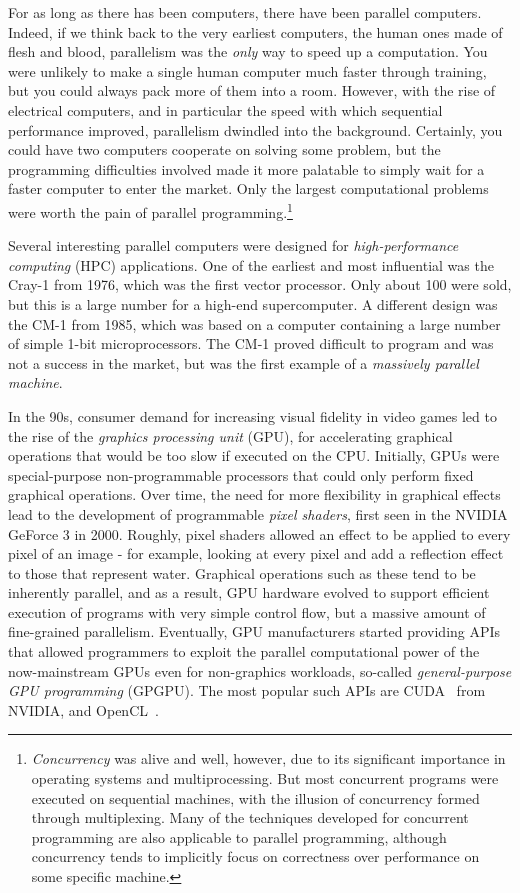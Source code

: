 For as long as there has been computers, there have been parallel
computers.  Indeed, if we think back to the very earliest computers,
the human ones made of flesh and blood, parallelism was the
\textit{only} way to speed up a computation.  You were unlikely to
make a single human computer much faster through training, but you
could always pack more of them into a room.  However, with the rise of
electrical computers, and in particular the speed with which
sequential performance improved, parallelism dwindled into the
background.  Certainly, you could have two computers cooperate on
solving some problem, but the programming difficulties involved made
it more palatable to simply wait for a faster computer to enter the
market.  Only the largest computational problems were worth the pain
of parallel programming.\footnote{\textit{Concurrency} was alive and
  well, however, due to its significant importance in operating
  systems and multiprocessing.  But most concurrent programs were
  executed on sequential machines, with the illusion of concurrency
  formed through multiplexing.  Many of the techniques developed for
  concurrent programming are also applicable to parallel programming,
  although concurrency tends to implicitly focus on correctness over
  performance on some specific machine.}

Several interesting parallel computers were designed for
\textit{high-performance computing} (HPC) applications.  One of the
earliest and most influential was the Cray-1 from 1976, which was the
first vector processor.  Only about 100 were sold, but this is a large
number for a high-end supercomputer.  A different design was the CM-1
from 1985, which was based on a computer containing a large number of
simple 1-bit microprocessors.  The CM-1 proved difficult to program
and was not a success in the market, but was the first example of a
\textit{massively parallel machine}.

In the 90s, consumer demand for increasing visual fidelity in video
games led to the rise of the \textit{graphics processing unit} (GPU),
for accelerating graphical operations that would be too slow if
executed on the CPU.  Initially, GPUs were special-purpose
non-programmable processors that could only perform fixed graphical
operations.  Over time, the need for more flexibility in graphical
effects lead to the development of programmable \textit{pixel
  shaders}, first seen in the NVIDIA GeForce 3 in 2000.  Roughly,
pixel shaders allowed an effect to be applied to every pixel of an
image - for example, looking at every pixel and add a reflection
effect to those that represent water.  Graphical operations such as
these tend to be inherently parallel, and as a result, GPU hardware
evolved to support efficient execution of programs with very simple
control flow, but a massive amount of fine-grained parallelism.
Eventually, GPU manufacturers started providing APIs that allowed
programmers to exploit the parallel computational power of the
now-mainstream GPUs even for non-graphics workloads, so-called
\textit{general-purpose GPU programming} (GPGPU).  The most popular
such APIs are CUDA~\cite{cuda} from NVIDIA, and
OpenCL~\cite{Stone:2010:OPP:622179.1803953}.

